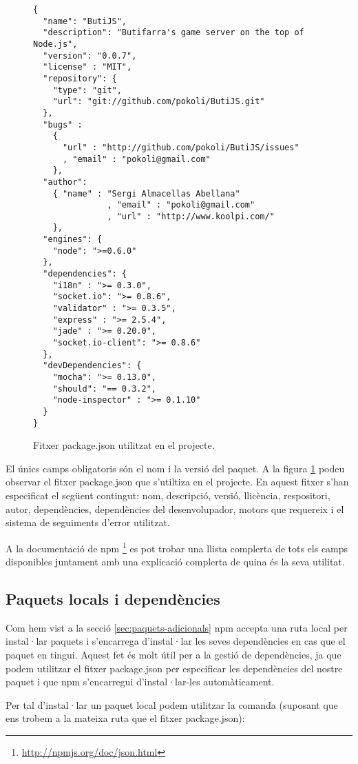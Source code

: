 \begin{figure}[htbp]
\begin{lstlisting}
{
  "name": "ButiJS",
  "description": "Butifarra's game server on the top of Node.js",
  "version": "0.0.7",
  "license" : "MIT",
  "repository": {
    "type": "git",
    "url": "git://github.com/pokoli/ButiJS.git"
  },
  "bugs" :
    { 
      "url" : "http://github.com/pokoli/ButiJS/issues"
      , "email" : "pokoli@gmail.com"
    },
  "author":
    { "name" : "Sergi Almacellas Abellana"
               , "email" : "pokoli@gmail.com"
               , "url" : "http://www.koolpi.com/"
    },
  "engines": {
    "node": ">=0.6.0"
  },
  "dependencies": {
    "i18n" : ">= 0.3.0",
    "socket.io": ">= 0.8.6",
    "validator" : ">= 0.3.5",
    "express" : ">= 2.5.4",
    "jade" : ">= 0.20.0",
    "socket.io-client": ">= 0.8.6"
  },
  "devDependencies": {
    "mocha": ">= 0.13.0",
    "should": "== 0.3.2",
    "node-inspector" : ">= 0.1.10"
  }
}
\end{lstlisting}
\caption{Fitxer package.json utilitzat en el projecte.}
\label{fig:package.json}
\end{figure} 

El únics camps obligatoris són el nom i la versió del paquet. A la figura \ref{fig:package.json} podeu observar el fitxer package.json que s'utiltiza en el projecte. En aquest fitxer s'han especificat el següent contingut: nom, descripció, versió, llicència, respositori, autor, dependències, dependències del desenvolupador, motors que requereix i el sistema de seguiments d'error utilitzat. 

A la documentació de npm \footnote{\url{http://npmjs.org/doc/json.html}} es pot trobar una llista complerta de tots els camps disponibles juntament amb una explicació complerta de quina és la seva utilitat. 

\subsection{Paquets locals i dependències}

Com hem vist a la secció \ref{sec:paquets-adicionals} npm accepta una ruta local per instal·lar paquets i s'encarrega d'instal·lar les seves dependències en cas que el paquet en tingui. Aquest fet és molt útil per a la gestió de dependències, ja que podem utilitzar el fitxer package.json per especificar les dependències del nostre paquet i que npm s'encarregui d'instal·lar-les automàticament. 

Per tal d'instal·lar un paquet local podem utilitzar la comanda (suposant que ens trobem a la mateixa ruta que el fitxer package.json): 

